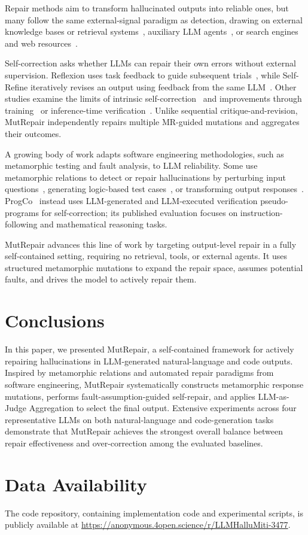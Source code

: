 \documentclass[acmsmall,screen,review,anonymous]{acmart}
\begin{document}
Repair methods aim to transform hallucinated outputs into reliable ones, but many follow the same external-signal paradigm as detection, drawing on external knowledge bases or retrieval systems~\cite{li2025rac}, auxiliary LLM agents~\cite{kwartler2024good}, or search engines and web resources~\cite{vladika2025correcting}.

Self-correction asks whether LLMs can repair their own errors without external supervision. Reflexion uses task feedback to guide subsequent trials~\cite{shinn2023reflexion}, while Self-Refine iteratively revises an output using feedback from the same LLM~\cite{madaan2023selfrefine}. Other studies examine the limits of intrinsic self-correction~\cite{huang2023large, tyen2024llms} and improvements through training~\cite{kumar2025training} or inference-time verification~\cite{wu2024large}. Unlike sequential critique-and-revision, MutRepair independently repairs multiple MR-guided mutations and aggregates their outcomes.

A growing body of work adapts software engineering methodologies, such as metamorphic testing and fault analysis, to LLM reliability. Some use metamorphic relations to detect or repair hallucinations by perturbing input questions~\cite{wu2025detecting}, generating logic-based test cases~\cite{li2024drowzee}, or transforming output responses~\cite{yang2025hallucination}. ProgCo~\cite{song2025progco} instead uses LLM-generated and LLM-executed verification pseudo-programs for self-correction; its published evaluation focuses on instruction-following and mathematical reasoning tasks.

MutRepair advances this line of work by targeting output-level repair in a fully self-contained setting, requiring no retrieval, tools, or external agents. It uses structured metamorphic mutations to expand the repair space, assumes potential faults, and drives the model to actively repair them.


\section{Conclusions}
In this paper, we presented MutRepair, a self-contained framework for actively repairing hallucinations in LLM-generated natural-language and code outputs. Inspired by metamorphic relations and automated repair paradigms from software engineering, MutRepair systematically constructs metamorphic response mutations, performs fault-assumption-guided self-repair, and applies LLM-as-Judge Aggregation to select the final output. Extensive experiments across four representative LLMs on both natural-language and code-generation tasks demonstrate that MutRepair achieves the strongest overall balance between repair effectiveness and over-correction among the evaluated baselines.

\section*{Data Availability}
The code repository, containing implementation code and experimental scripts, is publicly available at \url{https://anonymous.4open.science/r/LLMHalluMiti-3477}.




\end{document}

